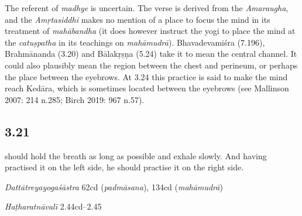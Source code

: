 \begin{ekdosis}
\begin{philcomm}[hp03_020]
The referent of \emph{madhye} is uncertain. The verse is derived from the \emph{Amaraugha}, and the \emph{Amṛtasiddhi} makes no mention of a place to focus the mind in its treatment of \emph{mahābandha} (it does however instruct the yogi to place the mind at the \emph{catuṣpatha} in its teachings on \emph{mahāmudrā}). Bhavadevamiśra (7.196), Brahmānanda (3.20) and Bālakṛṣṇa (5.24) take it to mean the central channel. It could also plausibly mean the region between the chest and perineum, or perhaps the place between the eyebrows. At 3.24 this practice is said to make the mind reach Kedāra, which is sometimes located between the eyebrows (see Mallinson 2007: 214 n.285; Birch 2019: 967 n.57).
\end{philcomm}

\subsection*{3.21}
\begin{translation} should hold the breath as long as possible and exhale slowly. And having practised it on the left side, he should practise it on the right side. 
\end{translation}

\begin{sources}[hp03_021]
\emph{Dattātreyayogaśāstra} 62cd (\emph{padmāsana}), 134cd (\emph{mahāmudrā})
\begin{versinnote}
\end{versinnote}
\end{sources}

\begin{testimonia}[hp03_021]
\emph{Haṭharatnāvalī} 2.44cd–2.45
\begin{versinnote}
\end{versinnote}


\end{testimonia}
\end{ekdosis}
